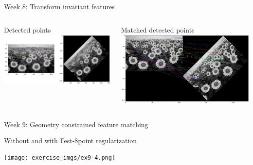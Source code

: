 \documentclass[aspectratio=169,hyperref={pdfpagelabels=false}]{beamer}
\begin{document}
\begin{frame}{ Week 8: Transform invariant features }
	\begin{columns}
		\begin{column}{.45\textwidth}
			\begin{block}{Detected points}
			\includegraphics[width=\textwidth]{exercise_imgs/ex8-1.png}
			\end{block}
		\end{column}
		\begin{column}{.45\textwidth}
			\begin{block}{Matched detected points}
			\includegraphics[width=\textwidth]{exercise_imgs/ex8-2.png}
			\end{block}
		\end{column}
	\end{columns}
\end{frame}

\begin{frame}{ Week 9: Geometry constrained feature matching }
	\begin{block}{Without and with Fest-8point regularization}
		\begin{center}
			\texttt{[image: exercise\_imgs/ex9-4.png]}
		\end{center}
	\end{block}
\end{frame}
\end{document}
